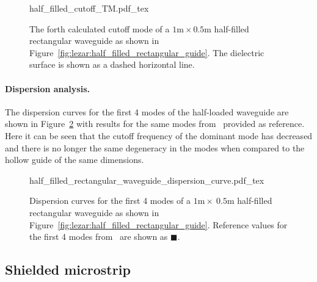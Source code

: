 \begin{figure}
\centering
  \def\svgwidth{\smallfig}
    {half_filled_cutoff_TM.pdf_tex}
\caption{The forth calculated cutoff mode of a
$1\text{m}\times0.5\text{m}$ half-filled rectangular waveguide as shown
in Figure~\ref{fig:lezar:half_filled_rectangular_guide}. The dielectric
surface is shown as a dashed horizontal line.}
\label{fig:lezar:half_filled_rectangular_cutoff_TM}
\end{figure}

\paragraph{Dispersion analysis.}

The dispersion curves for the first 4
modes of the half-loaded waveguide are shown in
Figure~\ref{fig:lezar:half_loaded_rectangular_dispersion_curves}
with results for the same modes from~\citet{Jin2002} provided as
reference. Here it can be seen that the cutoff frequency of the dominant
mode has decreased and there is no longer the same degeneracy in the
modes when compared to the hollow guide of the same dimensions.
\begin{figure}
 \centering
  \def\svgwidth{\largefig}
  {half_filled_rectangular_waveguide_dispersion_curve.pdf_tex}
 \caption{Dispersion curves for the first 4 modes of a
 $1\text{m}\times~0.5\text{m}$ half-filled rectangular waveguide as shown
 in Figure~\ref{fig:lezar:half_filled_rectangular_guide}. Reference values
 for the first 4 modes from~\citet{Jin2002} are shown as $\blacksquare$.}
 \label{fig:lezar:half_loaded_rectangular_dispersion_curves}
\end{figure}

\subsection{Shielded microstrip}
\label{lezar:sec:shielded_microstrip}

